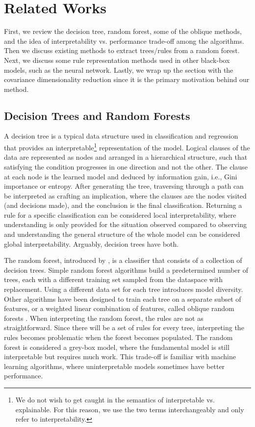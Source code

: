 \documentclass[11pt]{article}
\begin{document}
\section{Related Works}
\label{sec:related works}
First, we review the decision tree, random forest, some of the oblique methods, and the idea of interpretability vs. performance trade-off among the algorithms. Then we discuss existing methods to extract trees/rules from a random forest. Next, we discuss some rule representation methods used in other black-box models, such as the neural network. Lastly, we wrap up the section with the covariance dimensionality reduction since it is the primary motivation behind our method.
\subsection{Decision Trees and Random Forests}
A decision tree is a typical data structure used in classification and regression that provides an interpretable\footnote{We do not wish to get caught in the semantics of interpretable vs. explainable. For this reason, we use the two terms interchangeably and only refer to interpretability.} representation of the model. Logical clauses of the data are represented as nodes and arranged in a hierarchical structure, such that satisfying the condition progresses in one direction and not the other. The clause at each node is the learned model and deduced by information gain, i.e., Gini importance or entropy. After generating the tree, traversing through a path can be interpreted as crafting an implication, where the clauses are the nodes visited (and decisions made), and the conclusion is the final classification. Returning a rule for a specific classification can be considered local interpretability, where understanding is only provided for the situation observed compared to observing and understanding the general structure of the whole model can be considered global interpretability. Arguably, decision trees have both. 


The random forest, introduced by \cite{breiman2001random}, is a classifier that consists of a collection of decision trees. Simple random forest algorithms build a predetermined number of trees, each with a different training set sampled from the dataspace with replacement. Using a different data set for each tree introduces model diversity. Other algorithms have been designed to train each tree on a separate subset of features, or a weighted linear combination of features, called oblique random forests \citep{breiman2001random}. When interpreting the random forest, the rules are not as straightforward. Since there will be a set of rules for every tree, interpreting the rules becomes problematic when the forest becomes populated. The random forest is considered a grey-box model, where the fundamental model is still interpretable but requires much work. This trade-off is familiar with machine learning algorithms, where uninterpretable models sometimes have better performance. 
\end{document}
